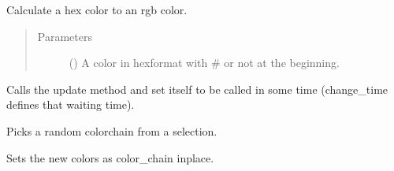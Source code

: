 \documentclass[letterpaper,10pt,english]{sphinxmanual}
\begin{document}
\begin{fulllineitems}
\begin{fulllineitems}
\label{\detokenize{anoog.automation:anoog.automation.bg_booster.Color_Gradient_Booster.hex2rgb}}
\sphinxAtStartPar
Calculate a hex color to an rgb color.
\begin{quote}\begin{description}
\item[{Parameters}] \leavevmode
\sphinxAtStartPar
{} () \textendash{} A color in hex\sphinxhyphen{}format with \# or not at the beginning.

\end{description}\end{quote}

\end{fulllineitems}


\begin{fulllineitems}
\label{\detokenize{anoog.automation:anoog.automation.bg_booster.Color_Gradient_Booster.run}}
\sphinxAtStartPar
Calls the update method and set itself to be called in some time (change\_time defines that waiting time).

\end{fulllineitems}


\begin{fulllineitems}
\label{\detokenize{anoog.automation:anoog.automation.bg_booster.Color_Gradient_Booster.set_fav_color}}
\sphinxAtStartPar
Picks a random color\sphinxhyphen{}chain from a selection.

\sphinxAtStartPar
Sets the new colors as color\_chain inplace.

\end{fulllineitems}



\end{fulllineitems}
\end{document}
